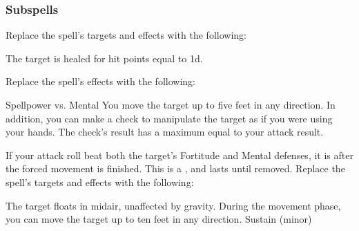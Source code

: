 \subsubsection{Subspells}
Replace the spell's targets and effects with the following:
\begin{spellcontent}
\begin{augmenttargetinginfo}
\end{augmenttargetinginfo}
\begin{augmenteffects}
\spelleffect
The target is healed for hit points equal to  \plus1d.
\end{augmenteffects}
\end{spellcontent}
Replace the spell's effects with the following:
\begin{spellcontent}
\begin{augmenteffects}
\begin{spellattack}{Spellpower vs. Mental}
\spellsuccess
You move the target up to five feet in any direction.
In addition, you can make a check to manipulate the target as if you were using your hands.
The check's result has a maximum equal to your attack result.
\end{spellattack}
\end{augmenteffects}
\end{spellcontent}
If your attack roll beat both the target's Fortitude and Mental defenses, it is \immobilized after the forced movement is finished.
This is a , and lasts until removed.
Replace the spell's targets and effects with the following:
\begin{spellcontent}
\begin{augmenttargetinginfo}
\end{augmenttargetinginfo}
\begin{augmenteffects}
\spelleffect
The target floats in midair, unaffected by gravity.
During the movement phase, you can move the target up to ten feet in any direction.
\spelldur Sustain (minor)
\end{augmenteffects}
\end{spellcontent}

